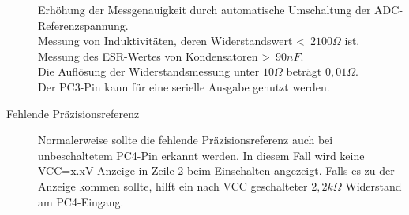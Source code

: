 \begin{description}
Erhöhung der Messgenauigkeit durch automatische Umschaltung der ADC-Referenzspannung.\\
Messung von Induktivitäten, deren Widerstandswert \textless~\(2100 \Omega\) ist.\\
Messung des ESR-Wertes von Kondensatoren \textgreater~\(90 nF\).\\
Die Auflösung der Widerstandsmessung unter \(10 \Omega\) beträgt \(0,01 \Omega\).\\
Der PC3-Pin kann für eine serielle Ausgabe genutzt werden.
\item[Fehlende Präzisionsreferenz]
Normalerweise sollte die fehlende Präzisionsreferenz auch bei unbeschaltetem PC4-Pin
erkannt werden. In diesem Fall wird keine VCC=x.xV Anzeige in Zeile 2 beim Einschalten
angezeigt. Falls es zu der Anzeige kommen sollte, hilft ein nach VCC geschalteter 
\(2,2k \Omega\) Widerstand am PC4-Eingang.
\end{description}

